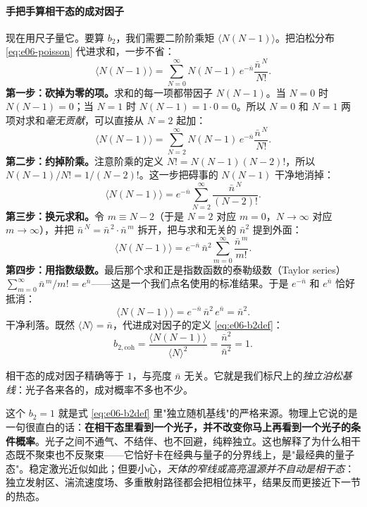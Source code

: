 \paragraph{手把手算相干态的成对因子}
\label{sec:e06-coherent-b2}

现在用尺子量它。要算 \(b_2\)，我们需要二阶阶乘矩 \(\langle N(N-1)\rangle\)。把泊松分布 \eqref{eq:e06-poisson} 代进求和，一步不省：
\[
  \langle N(N-1)\rangle
  =\sum_{N=0}^{\infty}N(N-1)\,e^{-\bar n}\frac{\bar n^{\,N}}{N!}.
\]
\textbf{第一步：砍掉为零的项。}求和的每一项都带因子 \(N(N-1)\)。当 \(N=0\) 时 \(N(N-1)=0\)；当 \(N=1\) 时 \(N(N-1)=1\cdot 0=0\)。所以 \(N=0\) 和 \(N=1\) 两项对求和\emph{毫无贡献}，可以直接从 \(N=2\) 起加：
\[
  \langle N(N-1)\rangle
  =\sum_{N=2}^{\infty}N(N-1)\,e^{-\bar n}\frac{\bar n^{\,N}}{N!}.
\]
\textbf{第二步：约掉阶乘。}注意阶乘的定义 \(N!=N(N-1)(N-2)!\)，所以 \(N(N-1)/N!=1/(N-2)!\)。这一步把碍事的 \(N(N-1)\) 干净地消掉：
\[
  \langle N(N-1)\rangle
  =e^{-\bar n}\sum_{N=2}^{\infty}\frac{\bar n^{\,N}}{(N-2)!}.
\]
\textbf{第三步：换元求和。}令 \(m\equiv N-2\)（于是 \(N=2\) 对应 \(m=0\)，\(N\to\infty\) 对应 \(m\to\infty\)），并把 \(\bar n^{\,N}=\bar n^{\,2}\cdot\bar n^{\,m}\) 拆开，把与求和无关的 \(\bar n^2\) 提到外面：
\[
  \langle N(N-1)\rangle
  =e^{-\bar n}\,\bar n^{2}\sum_{m=0}^{\infty}\frac{\bar n^{\,m}}{m!}.
\]
\textbf{第四步：用指数级数。}最后那个求和正是指数函数的泰勒级数（Taylor series）\(\sum_{m=0}^{\infty}\bar n^{\,m}/m!=e^{\bar n}\)——这是一个我们点名使用的标准结果。于是 \(e^{-\bar n}\) 和 \(e^{\bar n}\) 恰好抵消：
\[
  \langle N(N-1)\rangle
  =e^{-\bar n}\,\bar n^{2}\,e^{\bar n}
  =\bar n^{2}.
\]
干净利落。既然 \(\langle N\rangle=\bar n\)，代进成对因子的定义 \eqref{eq:e06-b2def}：
\begin{equation}
  b_{2,\text{coh}}=\frac{\langle N(N-1)\rangle}{\langle N\rangle^{2}}
  =\frac{\bar n^{2}}{\bar n^{2}}=1.
  \label{eq:e06-coherent-b2}
\end{equation}
\begin{formulaexplain}
相干态的成对因子精确等于 \(1\)，与亮度 \(\bar n\) 无关。它就是我们标尺上的\emph{独立泊松基线}：光子各来各的，成对概率不多也不少。
\end{formulaexplain}

这个 \(b_2=1\) 就是式 \eqref{eq:e06-b2def} 里"独立随机基线"的严格来源。物理上它说的是一句很直白的话：\textbf{在相干态里看到一个光子，并不改变你马上再看到一个光子的条件概率}。光子之间不通气、不结伴、也不回避，纯粹独立。这也解释了为什么相干态既不聚束也不反聚束——它恰好卡在经典与量子的分界线上，是"最经典的量子态"。稳定激光近似如此；但要小心，\emph{天体的窄线或高亮温源并不自动是相干态}：独立发射区、湍流速度场、多重散射路径都会把相位抹平，结果反而更接近下一节的热态。

